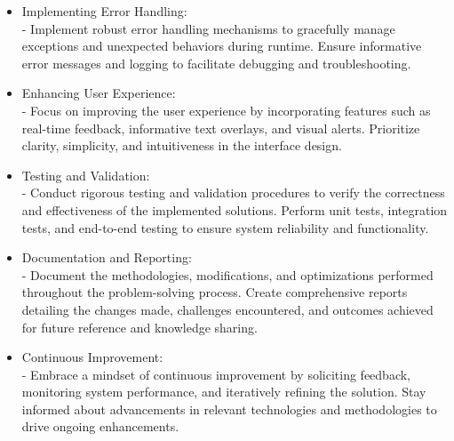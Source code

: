 \documentclass[12pt]{article}
\begin{document}
\begin{itemize}
\item Implementing Error Handling:\\ - Implement robust error handling mechanisms to gracefully manage exceptions and unexpected behaviors during runtime. Ensure informative error messages and logging to facilitate debugging and troubleshooting.

\item Enhancing User Experience:\\ - Focus on improving the user experience by incorporating features such as real-time feedback, informative text overlays, and visual alerts. Prioritize clarity, simplicity, and intuitiveness in the interface design.

\item Testing and Validation:\\ - Conduct rigorous testing and validation procedures to verify the correctness and effectiveness of the implemented solutions. Perform unit tests, integration tests, and end-to-end testing to ensure system reliability and functionality.

\item Documentation and Reporting:\\ - Document the methodologies, modifications, and optimizations performed throughout the problem-solving process. Create comprehensive reports detailing the changes made, challenges encountered, and outcomes achieved for future reference and knowledge sharing.

\item Continuous Improvement:\\ - Embrace a mindset of continuous improvement by soliciting feedback, monitoring system performance, and iteratively refining the solution. Stay informed about advancements in relevant technologies and methodologies to drive ongoing enhancements.
\end{itemize}

\newpage
\end{document}

